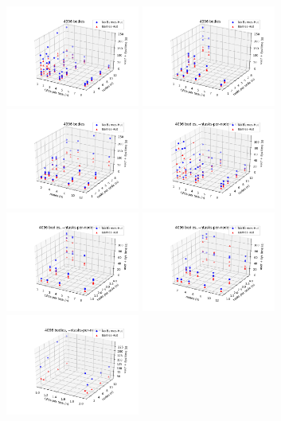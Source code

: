 \documentclass[11pt,a4paper]{article}
\begin{document}
\includegraphics[width=4.4cm]{4096-cpusPerTask-nodes}
\includegraphics[width=4.4cm]{4096-cpusPerTask-tasksPerNode}
\includegraphics[width=4.4cm]{4096-nodes-tasksPerNode}
\includegraphics[width=4.4cm]{4096-cpusPerTask-nodes-elide_8_tpn}
\includegraphics[width=4.4cm]{4096-cpusPerTask-tasksPerNode-elide_8_tpn}
\includegraphics[width=4.4cm]{4096-nodes-tasksPerNode-elide_8_tpn}
\includegraphics[width=4.4cm]{4096-cpusPerTask-nodes-just_1_tpn}
\end{document}

